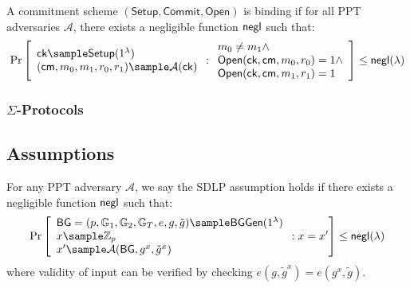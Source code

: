 \begin{definition}[Binding]
A commitment scheme $(\mathsf{Setup}, \mathsf{Commit}, \mathsf{Open})$ is binding if for all PPT adversaries $\mathcal{A}$, there exists a negligible function $\mathsf{negl}$ such that:
$$\Pr\left[\begin{array}{l}
    \mathsf{ck} \sample \mathsf{Setup}(1^\lambda) \\
    (\mathsf{cm}, m_0, m_1, r_0, r_1) \sample \mathcal{A}(\mathsf{ck})
\end{array} : \begin{array}{l}
    m_0 \neq m_1 \land \\
    \mathsf{Open}(\mathsf{ck}, \mathsf{cm}, m_0, r_0) = 1 \land \\
    \mathsf{Open}(\mathsf{ck}, \mathsf{cm}, m_1, r_1) = 1
\end{array}\right] \leq \negl(\lambda)$$
\end{definition}

\subsubsection{$\Sigma$-Protocols}

\subsection{Assumptions}


\begin{definition}\label{sdlp}
For any PPT adversary $\mathcal{A}$, we say the SDLP assumption holds if there exists a negligible function $\mathsf{negl}$ such that:
$$\Pr\left[\begin{array}{l}
    \BG = (p, \G_1, \G_2, \G_T, e, g, \tilde{g}) \sample \BGGen(1^\lambda) \\
    x \sample \Z_p \\
    x' \sample \mathcal{A}(\BG, g^x, \tilde{g}^x)
\end{array} : x = x'\right] \leq \negl(\lambda)$$
where validity of input can be verified by checking $e(g, \tilde{g}^x) = e(g^x, \tilde{g})$.
\end{definition} 


